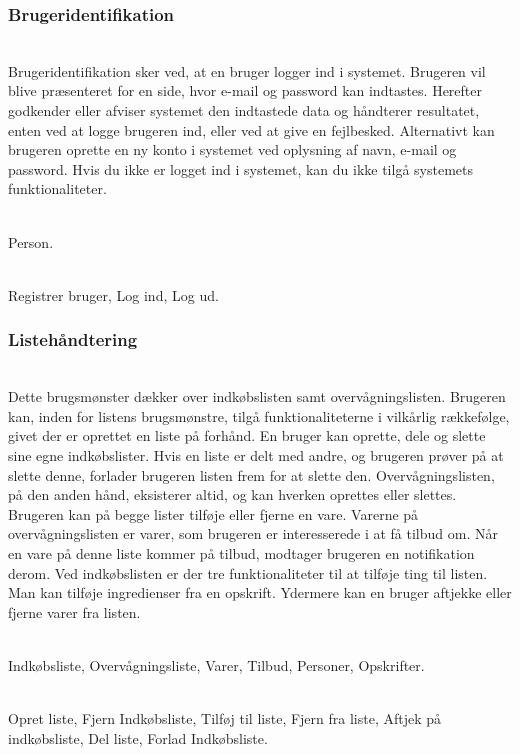\subsubsection{Brugeridentifikation}
\begin{description}[font=\normalfont\itshape]
\item[Brugsmønster]\hfill\\
Brugeridentifikation sker ved, at en bruger logger ind i systemet.
Brugeren vil blive præsenteret for en side, hvor e-mail og password kan indtastes.
Herefter godkender eller afviser systemet den indtastede data og håndterer resultatet, enten ved at logge brugeren ind, eller ved at give en fejlbesked.
Alternativt kan brugeren oprette en ny konto i systemet ved oplysning af navn, e-mail og password.
Hvis du ikke er logget ind i systemet, kan du ikke tilgå systemets funktionaliteter.
\item[Objekter]\hfill\\
Person.
\item[Funktioner]\hfill\\
Registrer bruger, Log ind, Log ud.
\end{description}

\subsubsection{Listehåndtering}
\begin{description}[font=\normalfont\itshape]
\item[Brugsmønster]\hfill\\
Dette brugsmønster dækker over indkøbslisten samt overvågningslisten.
Brugeren kan, inden for listens brugsmønstre, tilgå funktionaliteterne i vilkårlig rækkefølge, givet der er oprettet en liste på forhånd.
En bruger kan oprette, dele og slette sine egne indkøbslister.
Hvis en liste er delt med andre, og brugeren prøver på at slette denne, forlader brugeren listen frem for at slette den.
Overvågningslisten, på den anden hånd, eksisterer altid, og kan hverken oprettes eller slettes.
Brugeren kan på begge lister tilføje eller fjerne en vare.
Varerne på overvågningslisten er varer, som brugeren er interesserede i at få tilbud om.
Når en vare på denne liste kommer på tilbud, modtager brugeren en notifikation derom.
Ved indkøbslisten er der tre funktionaliteter til at tilføje ting til listen.
Man kan tilføje ingredienser fra en opskrift.
Ydermere kan en bruger aftjekke eller fjerne varer fra listen.
\item[Objekter]\hfill\\
Indkøbsliste, Overvågningsliste, Varer, Tilbud, Personer, Opskrifter.
\item[Funktioner]\hfill\\
Opret liste, Fjern Indkøbsliste, Tilføj til liste, Fjern fra liste, Aftjek på indkøbsliste, Del liste, Forlad Indkøbsliste.
\end{description}

